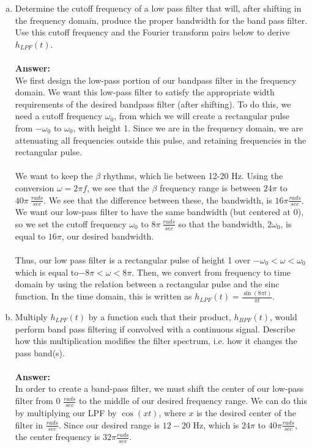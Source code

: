 \documentclass[12pt, a4paper]{article}
\begin{document}
\begin{enumerate}[(a)]
\item Determine the cutoff frequency of a low pass filter that will, after shifting in the
frequency domain, produce the proper bandwidth for the band pass filter. Use this
cutoff frequency and the Fourier transform pairs below to derive $h_{LPF}(t)$. \\ \\
\textbf{Answer: } \\
We first design the low-pass portion of our bandpass filter in the frequency domain. We want this low-pass filter to satisfy the appropriate width requirements of the desired bandpass filter (after shifting). To do this, we need a cutoff frequency $\omega_0$, from which we will create a rectangular pulse from $-\omega_0$ to $\omega_0$, with height 1. Since we are in the frequency domain, we are attenuating all frequencies outside this pulse, and retaining frequencies in the rectangular pulse. \\ \\
We want to keep the $\beta$ rhythms, which lie between 12-20 Hz. Using the conversion $\omega = 2 \pi f$, we see that the $\beta$ frequency range is between $24 \pi$ to $40 \pi \ \frac{rads}{sec}$. We see that the difference between these, the bandwidth, is $ 16 \pi \frac{rads}{sec}$. We want our low-pass filter to have the same bandwidth (but centered at 0), so we set the cutoff frequency $\omega_0$ to 8$\pi \ \frac{rads}{sec}$ so that the bandwidth, $2\omega_0$, is equal to $16\pi$, our desired bandwidth. \\ \\
Thus, our low pass filter is a rectangular pulse of height 1 over $ - \omega_0 < \omega < \omega_0$ which is equal to$ -8\pi < \omega < 8 \pi$. Then, we convert from frequency to time domain by using the relation between a rectangular pulse and the sinc function. In the time domain, this is written as $h_{LPF}(t) = \frac{\sin(8\pi t)}{\pi t}$. 
\item Multiply $h_{LPF}(t)$ by a function such that their product, $h_{BPF}(t)$, would perform band
pass filtering if convolved with a continuous signal. Describe how this multiplication
modifies the filter spectrum, i.e. how it changes the pass band(s). \\ \\
\textbf{Answer: } \\
In order to create a band-pass filter, we must shift the center of our low-pass filter from 0 $\frac{rads}{sec}$ to the middle of our desired frequency range. We can do this by multiplying our LPF by $\cos(x t)$, where $x$ is the desired center of the filter in $\frac{rads}{sec}$. Since our desired range is $12 -20$ Hz, which is $24\pi$ to $40 \pi \frac{rads}{sec}$, the center frequency is $32 \pi \frac{rads}{sec}$. \\ \\

\end{enumerate}
\end{document}
